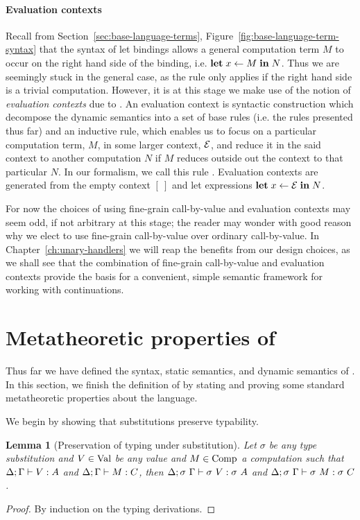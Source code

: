 \documentclass[12pt,phd,lfcs,twoside,openright,logo,leftchapter,normalheadings]{infthesis}
\theoremstyle{plain}
\newtheorem{lemma}[theorem]{Lemma}
\theoremstyle{definition}
\begin{document}
\paragraph{Evaluation contexts}
Recall from Section~\ref{sec:base-language-terms},
Figure~\ref{fig:base-language-term-syntax} that the syntax of let
bindings allows a general computation term $M$ to occur on the right
hand side of the binding, i.e. $\mathbf{let}\;x \leftarrow M \;\mathbf{in}\;N$. Thus we
are seemingly stuck in the general case, as the  rule only
applies if the right hand side is a trivial computation.
%
However, it is at this stage we make use of the notion of
\emph{evaluation contexts} due to \citet{Felleisen87}. An evaluation
context is syntactic construction which decompose the dynamic
semantics into a set of base rules (i.e. the rules presented thus far)
and an inductive rule, which enables us to focus on a particular
computation term, $M$, in some larger context, $\mathcal{E}$, and reduce it in
the said context to another computation $N$ if $M$ reduces outside out
the context to that particular $N$. In our formalism, we call this
rule . Evaluation contexts are generated from the empty
context $[~]$ and let expressions $\mathbf{let}\;x \leftarrow \mathcal{E} \;\mathbf{in}\;N$.

For now the choices of using fine-grain call-by-value and evaluation
contexts may seem odd, if not arbitrary at this stage; the reader may
wonder with good reason why we elect to use fine-grain call-by-value
over ordinary call-by-value.  In Chapter~\ref{ch:unary-handlers} we
will reap the benefits from our design choices, as we shall see that
the combination of fine-grain call-by-value and evaluation contexts
provide the basis for a convenient, simple semantic framework for
working with continuations.

\section{Metatheoretic properties of \BCalc{}}
\label{sec:base-language-metatheory}

Thus far we have defined the syntax, static semantics, and dynamic
semantics of \BCalc{}. In this section, we finish the definition of
\BCalc{} by stating and proving some standard metatheoretic properties
about the language.
%

We begin by showing that substitutions preserve typability.
%
\begin{lemma}[Preservation of typing under substitution]\label{lem:base-language-subst}
  Let $\sigma$ be any type substitution and $V \in \textrm{Val}$ be any
  value and $M \in \textrm{Comp}$ a computation such that
  $\Delta;\Gamma \vdash V : A$ and $\Delta;\Gamma \vdash M : C$, then
  $\Delta;\sigma~\Gamma \vdash \sigma~V : \sigma~A$ and
  $\Delta;\sigma~\Gamma \vdash \sigma~M : \sigma~C$.
\end{lemma}
%
\begin{proof}
  By induction on the typing derivations.
\end{proof}
%
\end{document}
